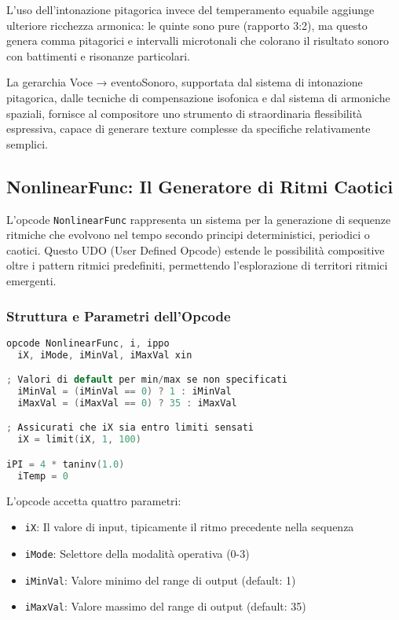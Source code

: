 L'uso dell'intonazione pitagorica invece del temperamento equabile aggiunge ulteriore ricchezza armonica: le quinte sono pure (rapporto 3:2), ma questo genera comma pitagorici e intervalli microtonali che colorano il risultato sonoro con battimenti e risonanze particolari.

La gerarchia Voce → eventoSonoro, supportata dal sistema di intonazione pitagorica, dalle tecniche di compensazione isofonica e dal sistema di armoniche spaziali, fornisce al compositore uno strumento di straordinaria flessibilità espressiva, capace di generare texture complesse da specifiche relativamente semplici.
\subsection{NonlinearFunc: Il Generatore di Ritmi Caotici}
L'opcode \texttt{NonlinearFunc} rappresenta un sistema per la generazione di sequenze ritmiche che evolvono nel tempo secondo principi deterministici, periodici o caotici. Questo UDO (User Defined Opcode) estende le possibilità compositive oltre i pattern ritmici predefiniti, permettendo l'esplorazione di territori ritmici emergenti.
\subsubsection{Struttura e Parametri dell'Opcode}
\begin{lstlisting}[language=C]
opcode NonlinearFunc, i, ippo
  iX, iMode, iMinVal, iMaxVal xin

; Valori di default per min/max se non specificati
  iMinVal = (iMinVal == 0) ? 1 : iMinVal
  iMaxVal = (iMaxVal == 0) ? 35 : iMaxVal

; Assicurati che iX sia entro limiti sensati
  iX = limit(iX, 1, 100)

iPI = 4 * taninv(1.0)  
  iTemp = 0
\end{lstlisting}

L'opcode accetta quattro parametri:
\begin{itemize}
    \item \texttt{iX}: Il valore di input, tipicamente il ritmo precedente nella sequenza
    \item \texttt{iMode}: Selettore della modalità operativa (0-3)
    \item \texttt{iMinVal}: Valore minimo del range di output (default: 1)
    \item \texttt{iMaxVal}: Valore massimo del range di output (default: 35)
\end{itemize}

